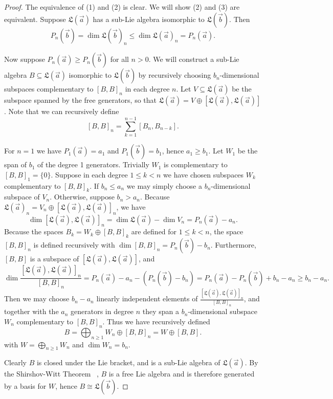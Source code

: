 \documentclass[11pt]{amsart}
\theoremstyle{definition}
\numberwithin{equation}{section}
\begin{document}
\begin{proof}
    The equivalence of (1) and (2) is clear. We will show (2) and (3) are equivalent. Suppose $\mathfrak{L}(\vec{a})$ has a sub-Lie algebra isomorphic to $\mathfrak{L}(\vec{b})$. Then
    \[
    P_n(\vec{b}) = \dim \mathfrak{L}(\vec{b})_n \leq \dim \mathfrak{L}(\vec{a})_n = P_n(\vec{a}).
    \]

    Now suppose $P_n(\vec{a}) \geq P_n(\vec{b})$ for all $n > 0$. We will construct a sub-Lie algebra $B \subseteq \mathfrak{L}(\vec{a})$ isomorphic to $\mathfrak{L}(\vec{b})$ by recursively choosing $b_n$-dimensional subspaces complementary to $[B,B]_n$ in each degree $n$. Let $V \subseteq \mathfrak{L}(\vec{a})$ be the subspace spanned by the free generators, so that $\mathfrak{L}(\vec{a}) = V \oplus [\mathfrak{L}(\vec{a}),\mathfrak{L}(\vec{a})]$. Note that we can recursively define 
    \[ 
    [B,B]_n = \sum_{k=1}^{n-1} [B_n,B_{n-k}].
    \]

    For $n=1$ we have $P_1(\vec{a}) = a_1$ and $P_1(\vec{b}) = b_1$, hence $a_1 \geq b_1$. Let $W_1$ be the span of $b_1$ of the degree 1 generators. Trivially $W_1$ is complementary to $[B,B]_1 = \{0\}.$
    Suppose in each degree $1 \leq k < n$ we have chosen subspaces $W_k$ complementary to $[B,B]_k$. If $b_n \leq a_n$ we may simply choose a $b_n$-dimensional subspace of $V_n$. Otherwise, suppose $b_n > a_n$. Because $\mathfrak{L}(\vec{a})_n = V_n \oplus [\mathfrak{L}(\vec{a}),\mathfrak{L}(\vec{a})]_n$, we have
    \[
    \dim [\mathfrak{L}(\vec{a}),\mathfrak{L}(\vec{a})]_n = \dim \mathfrak{L}(\vec{a}) - \dim V_n = P_n(\vec{a}) - a_n.
    \]
    Because the spaces $B_k = W_k \oplus [B,B]_k$ are defined for $1 \leq k < n$, the space $[B,B]_n$ is defined recursively with $\dim [B,B]_n = P_n(\vec{b}) - b_n$. Furthermore, $[B,B]$ is a subspace of $[\mathfrak{L}(\vec{a}),\mathfrak{L}(\vec{a})]$, and
    \[
    \dim \frac{[\mathfrak{L}(\vec{a}),\mathfrak{L}(\vec{a})]_n}{[B,B]_n} = P_n(\vec{a}) - a_n - (P_n(\vec{b}) - b_n) = P_n(\vec{a}) - P_n(\vec{b}) + b_n - a_n \geq b_n - a_n. 
    \]
    Then we may choose $b_n - a_n$ linearly independent elements of $\frac{[\mathfrak{L}(\vec{a}),\mathfrak{L}(\vec{a})]_n}{[B,B]_n}$, and together with the $a_n$ generators in degree $n$ they span a $b_n$-dimensional subspace $W_n$ complementary to $[B,B]_n.$ Thus we have recursively defined 
    \[
    B = \bigoplus_{n\geq 1}W_n \oplus [B,B]_n = W \oplus [B,B].
    \]
    with $W = \bigoplus_{n\geq 1} W_n$ and $\dim W_n = b_n$.
    
    Clearly $B$ is closed under the Lie bracket, and is a sub-Lie algebra of $\mathfrak{L}(\vec{a}).$ By the Shirshov-Witt Theorem ~\cite[text]{S09}, $B$ is a free Lie algebra and is therefore generated by a basis for $W$, hence $B \cong \mathfrak{L}(\vec{b}).$
\end{proof}


{}
\end{document}
